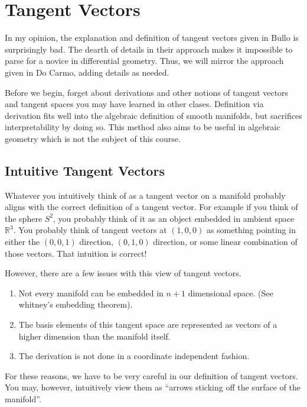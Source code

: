 \documentclass[a4paper]{article}
\begin{document}
\section*{Tangent Vectors}%
In my opinion, the explanation and definition of tangent vectors given in Bullo is surprisingly bad. The dearth of details in their approach makes it impossible to parse for a novice in differential geometry. Thus, we will mirror the approach given in Do Carmo, adding details as needed.

Before we begin, forget about derivations and other notions of tangent vectors and tangent spaces you may have learned in other clases. Definition via derivation fits well into the algebraic definition of smooth manifolds, but sacrifices interpretability by doing so. This method also aims to be useful in algebraic geometry which is not the subject of this course.

\subsection*{Intuitive Tangent Vectors}%
Whatever you intuitively think of as a tangent vector on a manifold probably aligns with the correct definition of a tangent vector. For example if you think of the sphere $S^2$, you probably think of it as an object embedded in ambient space $\mathds{R}^3$. You probably think of tangent vectors at $(1,0,0)$ as something pointing in either the $(0,0,1)$ direction, $(0,1,0)$ direction, or some linear combination of those vectors. That intuition is correct!

However, there are a few issues with this view of tangent vectors.
\begin{enumerate}
  \item Not every manifold can be embedded in $n + 1$ dimensional space. (See whitney's embedding theorem).
  \item The basis elements of this tangent space are represented as vectors of a higher dimension than the manifold itself.
  \item The derivation is not done in a coordinate independent fashion.
\end{enumerate}

For these reasons, we have to be very careful in our definition of tangent vectors. You may, however, intuitively view them as ``arrows sticking off the surface of the manifold''.
\end{document}
